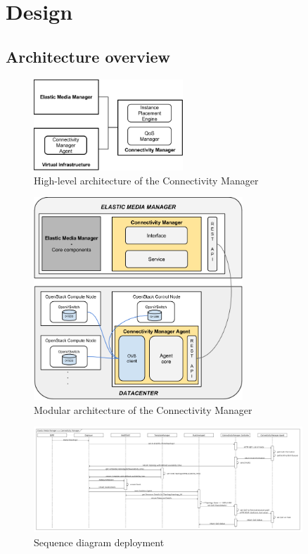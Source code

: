 \chapter{Design}

\section{Architecture overview}

\begin{figure}[H]
\centering

\includegraphics[width=0.5\textwidth]{images/design/functional_architecture}

\caption{High-level architecture of the Connectivity Manager}
\end{figure}

\begin{figure}[H]
\centering

\includegraphics[width=0.7\textwidth]{images/design/modular_architecture_cm_cma}

\caption{Modular architecture of the Connectivity Manager}
\end{figure}


\begin{figure}[H]
\centering

\includegraphics[width=0.9\textwidth]{images/design/sequence_diagram}

\caption{Sequence diagram deployment}
\end{figure}


